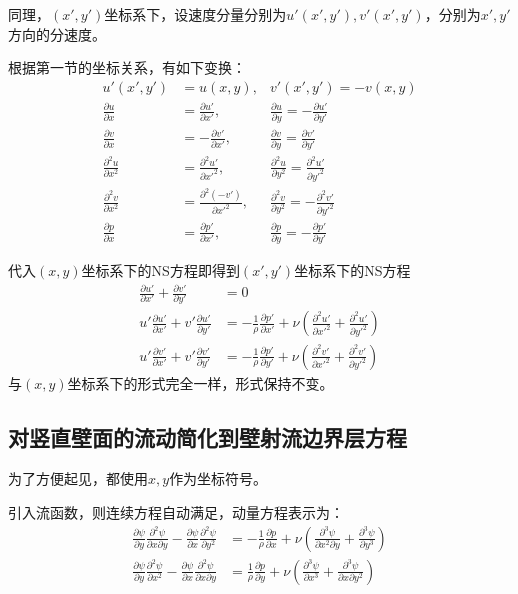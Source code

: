 同理，$(x',y')$坐标系下，设速度分量分别为$u'(x',y'),v'(x',y')$，分别为$x',y'$方向的分速度。

根据第一节的坐标关系，有如下变换：
\begin{align*}
    u'(x',y')&=u(x,y),&v'(x',y')=-v(x,y)\\
    \frac{\partial u}{\partial x}&=\frac{\partial u'}{\partial x'}, &\frac{\partial u}{\partial y}=-\frac{\partial u'}{\partial y'}\\
    \frac{\partial v}{\partial x}&=-\frac{\partial v'}{\partial x'}, &\frac{\partial v}{\partial y}=\frac{\partial v'}{\partial y'}\\
    \frac{\partial^{2} u}{\partial x^{2}}&=\frac{\partial^{2} u'}{\partial x'^{2}}, &\frac{\partial^{2} u}{\partial y^{2}}=\frac{\partial^{2} u'}{\partial y'^{2}}\\
    \frac{\partial^{2} v}{\partial x^{2}}&=\frac{\partial^{2} (-v')}{\partial x'^{2}}, & \frac{\partial^{2} v}{\partial y^{2}}=-\frac{\partial^{2} v'}{\partial y'^{2}}\\
    \frac{\partial p}{\partial x}&=\frac{\partial p'}{\partial x'}, &\frac{\partial p}{\partial y}=-\frac{\partial p'}{\partial y'}
\end{align*}

代入$(x,y)$坐标系下的NS方程即得到$(x',y')$坐标系下的NS方程
\begin{align}
    \frac{\partial u'}{\partial x'}+\frac{\partial v'}{\partial y'}&=0\\
    u'\frac{\partial u'}{\partial x'}+v'\frac{\partial u'}{\partial y'}&=-\frac{1}{\rho}\frac{\partial p'}{\partial x'}+\nu\left(\frac{\partial^{2} u'}{\partial x'^{2}}+\frac{\partial^{2} u'}{\partial y'^{2}}\right)\\
    u'\frac{\partial v'}{\partial x'}+v'\frac{\partial v'}{\partial y'}&=-\frac{1}{\rho}\frac{\partial p'}{\partial y'}+\nu\left(\frac{\partial^{2} v'}{\partial x'^{2}}+\frac{\partial^{2} v'}{\partial y'^{2}}\right)
\end{align}
与$(x,y)$坐标系下的形式完全一样，形式保持不变。

\subsection{对竖直壁面的流动简化到壁射流边界层方程}
为了方便起见，都使用$x,y$作为坐标符号。

引入流函数，则连续方程自动满足，动量方程表示为：
\begin{align}
    \frac{\partial \psi}{\partial y}\frac{\partial^{2} \psi}{\partial x\partial y}-\frac{\partial \psi}{\partial x}\frac{\partial^{2} \psi}{\partial y^{2}}&=-\frac{1}{\rho}\frac{\partial p}{\partial x}+\nu(\frac{\partial^{3} \psi}{\partial x^{2}\partial y}+\frac{\partial^{3} \psi}{\partial y^{3}})\\
    \frac{\partial \psi}{\partial y}\frac{\partial^{2} \psi}{\partial x^{2}}-\frac{\partial \psi}{\partial x}\frac{\partial^{2} \psi}{\partial x\partial y}&=\frac{1}{\rho}\frac{\partial p}{\partial y}+\nu(\frac{\partial^{3} \psi}{\partial x^{3}}+\frac{\partial^{3} \psi}{\partial x\partial y^{2}})
\end{align}

